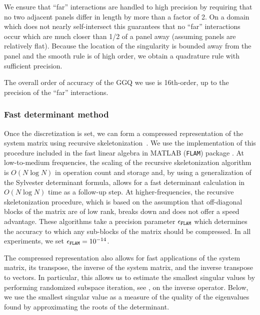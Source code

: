 \begin{remark}
  \label{rmk:levelrestrict}
  We ensure that ``far'' interactions
  are handled to high precision by requiring that
  no two adjacent panels differ in length
  by more than a factor of 2. On a domain which does
  not nearly self-intersect this
  guarantees that no ``far'' interactions occur
  which are much closer than 1/2 of a panel away
  (assuming panels are relatively flat).
  Because the location of the singularity is
  bounded away from the panel and the smooth
  rule is of high order, we obtain a quadrature
  rule with sufficient precision.

  The overall order of accuracy of the GGQ we use
  is {\color{red}16th-order}, up to the precision of the ``far''
  interactions.
\end{remark}

\subsubsection{Fast determinant method}

Once the discretization is set, we can form
a compressed representation of the system matrix
using recursive skeletonization~\cite{ho2012fast}.
%
We use the implementation of this procedure
included in the fast linear algebra in
MATLAB (\texttt{FLAM}) package
\cite{hoFLAM_1253582}.
%
At low-to-medium frequencies, the scaling
of the recursive skeletonization algorithm
is $O(N\log N)$ in operation count and
storage and, by using a generalization
of the Sylvester determinant formula,
allows for a fast determinant
calculation in $O(N\log N)$ time as a
follow-up step.
%
At higher-frequencies,
the recursive skeletonization procedure,
which is based on the assumption that off-diagonal
blocks of the matrix are of low rank,
breaks down and does not offer a speed advantage.
%
These algorithms take a precision parameter
${\epsilon_{\texttt{FLAM}}}$ which determines the
accuracy to which any sub-blocks of the matrix
should be compressed. In all experiments,
we set ${\epsilon_{\texttt{FLAM}}} = 10^{-14}$.

The compressed representation also allows
for fast applications of the system matrix,
its transpose, the inverse of the system
matrix, and the inverse transpose to
vectors.
%
In particular, this allows us to estimate the
smallest singular values by performing
randomized subspace iteration, see
\cite[Algorithm 4.4]{halko2011finding},
on the inverse operator.
%
Below, we use the smallest singular value
as a measure of the quality of the
eigenvalues found by approximating the
roots of the determinant.
%

